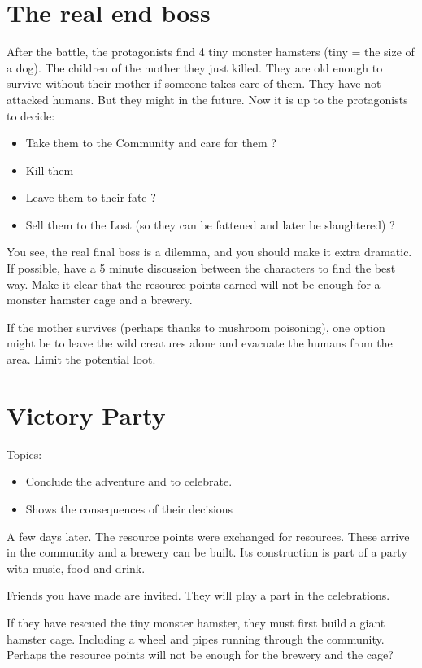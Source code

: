 \section{The real end boss}

After the battle, the protagonists find 4 tiny monster hamsters (tiny = the size of a dog). The children of the mother they just killed. They are old enough to survive without their mother if someone takes care of them. They have not attacked humans. But they might in the future. Now it is up to the protagonists to decide:

\begin{itemize}
    \item Take them to the Community and care for them ?
    \item Kill them
    \item Leave them to their fate ?
    \item Sell them to the Lost (so they can be fattened and later be slaughtered) ?
\end{itemize}

You see, the real final boss is a dilemma, and you should make it extra dramatic. If possible, have a 5 minute discussion between the characters to find the best way. Make it clear that the resource points earned will not be enough for a monster hamster cage and a brewery.

If the mother survives (perhaps thanks to mushroom poisoning), one option might be to leave the wild creatures alone and evacuate the humans from the area. Limit the potential loot.

\section{Victory Party}

Topics:

\begin{itemize}
\item Conclude the adventure and to celebrate.
\item Shows the consequences of their decisions
\end{itemize}

A few days later. The resource points were exchanged for resources. These arrive in the community and a brewery can be built. Its construction is part of a party with music, food and drink.

Friends you have made are invited. They will play a part in the celebrations.

If they have rescued the tiny monster hamster, they must first build a giant hamster cage. Including a wheel and pipes running through the community. Perhaps the resource points will not be enough for the brewery and the cage?

